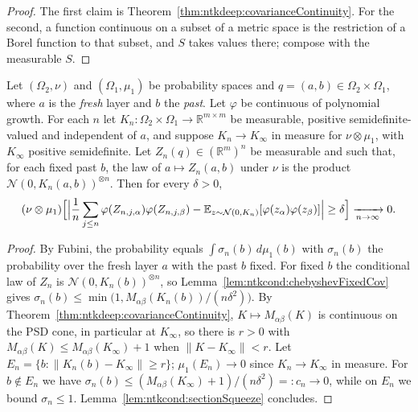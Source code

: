 \begin{proof}
  \leanok
The first claim is Theorem~\ref{thm:ntkdeep:covarianceContinuity}. For the second, a function continuous on a subset of a metric space is the restriction of a Borel function to that subset, and $S$ takes values there; compose with the measurable $S$.
\end{proof}

\begin{theorem}\label{thm:ntkcond:conditionalActivation}
  \leanok
Let $(\Omega_2,\nu)$ and $(\Omega_1,\mu_1)$ be probability spaces and $q=(a,b)\in\Omega_2\times\Omega_1$, where $a$ is the \emph{fresh} layer and $b$ the \emph{past}. Let $\varphi$ be continuous of polynomial growth. For each $n$ let $K_n:\Omega_2\times\Omega_1\to\mathbb R^{m\times m}$ be measurable, positive semidefinite-valued and independent of $a$, and suppose $K_n\to K_\infty$ in measure for $\nu\otimes\mu_1$, with $K_\infty$ positive semidefinite. Let $Z_n(q)\in(\mathbb R^m)^n$ be measurable and such that, for each fixed past $b$, the law of $a\mapsto Z_n(a,b)$ under $\nu$ is the product $\mathcal N(0,K_n(a,b))^{\otimes n}$. Then for every $\delta>0$,
\[
  (\nu\otimes\mu_1)\Bigl[\Bigl|\frac1n\sum_{j\le n}\varphi(Z_{n,j,\alpha})\varphi(Z_{n,j,\beta})-\mathbb E_{z\sim\mathcal N(0,K_n)}[\varphi(z_\alpha)\varphi(z_\beta)]\Bigr|\ge\delta\Bigr]\xrightarrow[n\to\infty]{}0 .
\]
\end{theorem}

\begin{proof}
  \leanok
By Fubini, the probability equals $\int\sigma_n(b)\,d\mu_1(b)$ with $\sigma_n(b)$ the probability over the fresh layer $a$ with the past $b$ fixed. For fixed $b$ the conditional law of $Z_n$ is $\mathcal N(0,K_n(b))^{\otimes n}$, so Lemma~\ref{lem:ntkcond:chebyshevFixedCov} gives $\sigma_n(b)\le\min\bigl(1,M_{\alpha\beta}(K_n(b))/(n\delta^2)\bigr)$. By Theorem~\ref{thm:ntkdeep:covarianceContinuity}, $K\mapsto M_{\alpha\beta}(K)$ is continuous on the PSD cone, in particular at $K_\infty$, so there is $r>0$ with $M_{\alpha\beta}(K)\le M_{\alpha\beta}(K_\infty)+1$ when $\|K-K_\infty\|<r$. Let $E_n=\{b:\|K_n(b)-K_\infty\|\ge r\}$; $\mu_1(E_n)\to0$ since $K_n\to K_\infty$ in measure. For $b\notin E_n$ we have $\sigma_n(b)\le(M_{\alpha\beta}(K_\infty)+1)/(n\delta^2)=:c_n\to0$, while on $E_n$ we bound $\sigma_n\le1$. Lemma~\ref{lem:ntkcond:sectionSqueeze} concludes.
\end{proof}

